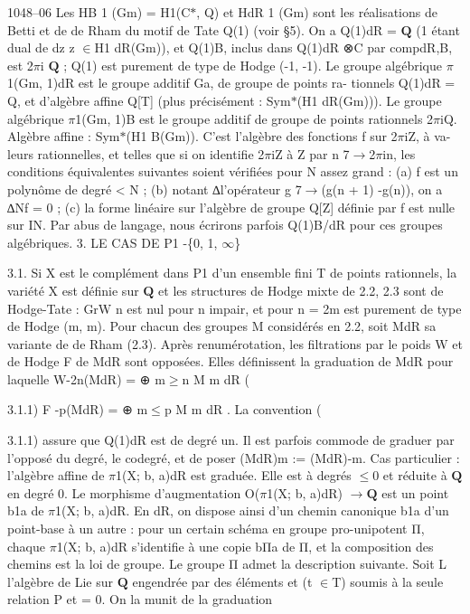 \documentclass[11pt]{article}
\begin{document}
1048--06 Les HB 1 (Gm) = H1(C\(*\), Q) et HdR 1 (Gm) sont les réalisations de Betti et de de Rham du motif de Tate Q(1) (voir §5). On a Q(1)dR = \(\mathbf Q\) (1 étant dual de dz z \(\in\)H1 dR(Gm)), et Q(1)B, inclus dans Q(1)dR ⊗C par compdR,B, est 2\(\pi\)i \(\mathbf Q\) ; Q(1) est purement de type de Hodge (-1, -1). Le groupe algébrique \(\pi\)1(Gm, 1)dR est le groupe additif Ga, de groupe de points ra- tionnels Q(1)dR = Q, et d’algèbre affine Q[T] (plus précisément : Sym\(*\)(H1 dR(Gm))). Le groupe algébrique \(\pi\)1(Gm, 1)B est le groupe additif de groupe de points rationnels 2\(\pi\)iQ. Algèbre affine : Sym\(*\)(H1 B(Gm)). C’est l’algèbre des fonctions f sur 2\(\pi\)iZ, à va- leurs rationnelles, et telles que si on identifie 2\(\pi\)iZ à Z par n 7\(\to\)2\(\pi\)in, les conditions équivalentes suivantes soient vérifiées pour N assez grand : (a) f est un polynôme de degré < N ; (b) notant ∆l’opérateur g 7\(\to\)(g(n + 1) -g(n)), on a ∆Nf = 0 ; (c) la forme linéaire sur l’algèbre de groupe Q[Z] définie par f est nulle sur IN. Par abus de langage, nous écrirons parfois Q(1)B/dR pour ces groupes algébriques. 3. LE CAS DE P1 -\{0, 1, \(\infty\)\} 

3.1. Si X est le complément dans P1 d’un ensemble fini T de points rationnels, la variété X est définie sur \(\mathbf Q\) et les structures de Hodge mixte de 2.2, 2.3 sont de Hodge-Tate : GrW n est nul pour n impair, et pour n = 2m est purement de type de Hodge (m, m). Pour chacun des groupes M considérés en 2.2, soit MdR sa variante de de Rham (2.3). Après renumérotation, les filtrations par le poids W et de Hodge F de MdR sont opposées. Elles définissent la graduation de MdR pour laquelle W-2n(MdR) = ⊕ m\(\ge\)n M m dR (

3.1.1) F -p(MdR) = ⊕ m\(\le\)p M m dR . La convention (

3.1.1) assure que Q(1)dR est de degré un. Il est parfois commode de graduer par l’opposé du degré, le codegré, et de poser (MdR)m := (MdR)-m. Cas particulier : l’algèbre affine de \(\pi\)1(X; b, a)dR est graduée. Elle est à degrés \(\le\)0 et réduite à \(\mathbf Q\) en degré 0. Le morphisme d’augmentation O(\(\pi\)1(X; b, a)dR) \(\to\)\(\mathbf Q\) est un point b1a de \(\pi\)1(X; b, a)dR. En dR, on dispose ainsi d’un chemin canonique b1a d’un point-base à un autre : pour un certain schéma en groupe pro-unipotent Π, chaque \(\pi\)1(X; b, a)dR s’identifie à une copie bΠa de Π, et la composition des chemins est la loi de groupe. Le groupe Π admet la description suivante. Soit L l’algèbre de Lie sur \(\mathbf Q\) engendrée par des éléments et (t \(\in\)T) soumis à la seule relation P et = 0. On la munit de la graduation
\end{document}
